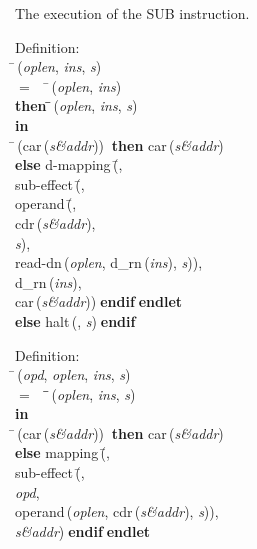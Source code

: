  The execution of the SUB instruction.
\begin{tabbing}{\sc Definition}: \\  
\=\,({\it{oplen\/}}, {\it{ins\/}}, {\it{s\/}}) \\ 
$=$$\;\;\;\;$\=\,({\it{oplen\/}}, {\it{ins\/}}) \\ 
{\bf then }\=\=\,({\it{oplen\/}}, {\it{ins\/}}, {\it{s\/}})\- \\ 
{\bf in} \\ 
\=\,({\rm{car}}\,({\it{s\&addr\/}}))$\;\;${\bf then }{\rm{car}}\,({\it{s\&addr\/}}) \\ 
{\bf else }{\rm{d-mapping}}\,(\=, \\ 
{\rm{sub-effect}}\,(\=, \\ 
{\rm{operand}}\,(\=, \\ 
{\rm{cdr}}\,({\it{s\&addr\/}}), \\ 
{\it{s\/}})\-, \\ 
{\rm{read-dn}}\,({\it{oplen\/}}, {\rm{d\_rn}}\,({\it{ins\/}}), {\it{s\/}}))\-, \\ 
{\rm{d\_rn}}\,({\it{ins\/}}), \\ 
{\rm{car}}\,({\it{s\&addr\/}}))\-$\;${\bf  endif}\-$\;${\bf  endlet}\- \\ 
{\bf else }{\rm{halt}}\,({}, {\it{s\/}})$\;${\bf  endif}\-\-
\end{tabbing}

\begin{tabbing}{\sc Definition}: \\  
\=\,({\it{opd\/}}, {\it{oplen\/}}, {\it{ins\/}}, {\it{s\/}}) \\ 
$=$$\;\;\;\;$\=\=\,({\it{oplen\/}}, {\it{ins\/}}, {\it{s\/}})\- \\ 
{\bf in} \\ 
\=\,({\rm{car}}\,({\it{s\&addr\/}}))$\;\;${\bf then }{\rm{car}}\,({\it{s\&addr\/}}) \\ 
{\bf else }{\rm{mapping}}\,(\=, \\ 
{\rm{sub-effect}}\,(\=, \\ 
{\it{opd\/}}, \\ 
{\rm{operand}}\,({\it{oplen\/}}, {\rm{cdr}}\,({\it{s\&addr\/}}), {\it{s\/}}))\-, \\ 
{\it{s\&addr\/}})\-$\;${\bf  endif}\-$\;${\bf  endlet}\-\-
\end{tabbing}

